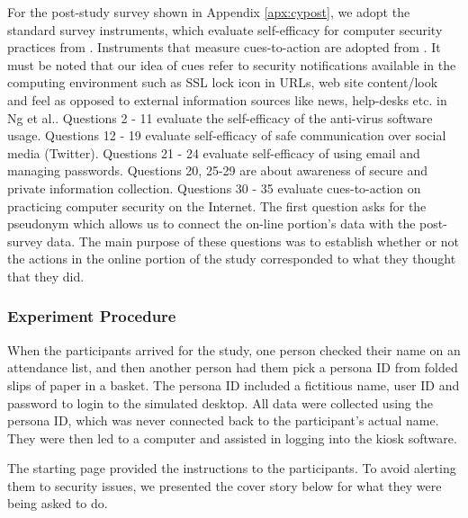 For the post-study survey shown in Appendix \ref{apx:cypost}, we adopt the standard survey instruments, which evaluate self-efficacy for computer security practices from \cite{ng2007, compeau1995}. Instruments that measure cues-to-action are adopted from \cite{ng2007}. It must be noted that our idea of cues refer to security notifications available in the computing environment such as SSL lock icon in URLs, web site content/look and feel as opposed to external information sources like news, help-desks etc. in Ng et al.\citeyear{ng2007}. Questions 2 - 11 evaluate the self-efficacy of the anti-virus software usage. Questions 12 - 19 evaluate self-efficacy of safe communication over social media (Twitter). Questions 21 - 24 evaluate self-efficacy of using email and managing passwords. Questions 20, 25-29 are about awareness of secure and private information collection. Questions 30 - 35 evaluate cues-to-action on practicing computer security on the Internet. The first question asks for the pseudonym which allows us to connect the on-line portion's data with the post-survey data. The main purpose of these questions was to establish whether or not the actions in the online portion of the study corresponded to what they thought that they did.


\subsubsection*{Experiment Procedure}
When the participants arrived for the study, one person checked their name on an attendance list, and then another person had them pick a persona ID from folded slips of paper in a basket. The persona ID included a fictitious name, user ID and password to login to the simulated desktop. All data were collected using the persona ID, which was never connected back to the participant's actual name. They were then led to a computer and assisted in logging into the kiosk software.

The starting page provided the instructions to the participants. To avoid alerting them to security issues, we presented the cover story below for what they were being asked to do.

